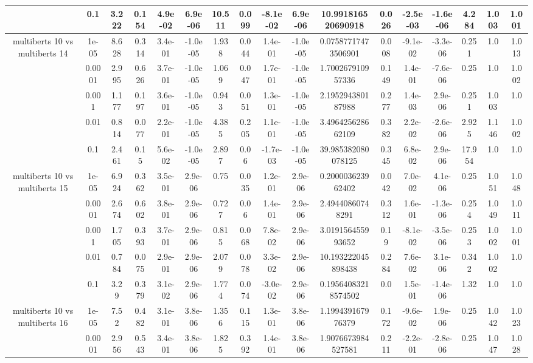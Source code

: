 \begin{tabular}{|c|c|c|c|c|c|c|c|c|c|c|c|c|c|c|c|c|}
 & 0.1 & 3.222 & 0.154 & 4.9e-02 & 6.9e-06 & 10.511 & 0.099 & -8.1e-02 & 6.9e-06 & 10.991816520690918 & 0.026 & -2.5e-03 & -1.6e-06 & 4.284 & 1.003 & 1.001 \\
\hline
\multirow{5}{*}{multiberts 10 vs multiberts 14} & 1e-05 & 8.628 & 0.314 & 3.4e-01 & -1.0e-05 & 1.938 & 0.044 & 1.4e-01 & -1.0e-05 & 0.07587717473506901 & 0.008 & -9.1e-02 & -3.3e-06 & 0.251 & 1.0 & 1.013 \\
 & 0.0001 & 2.995 & 0.626 & 3.7e-01 & -1.0e-05 & 1.069 & 0.047 & 1.7e-01 & -1.0e-05 & 1.700267910957336 & 0.149 & 1.4e-01 & -7.6e-06 & 0.25 & 1.0 & 1.002 \\
 & 0.001 & 1.177 & 0.197 & 3.6e-01 & -1.0e-05 & 0.943 & 0.051 & 1.3e-01 & -1.0e-05 & 2.195294380187988 & 0.277 & 1.4e-03 & 2.9e-06 & 0.251 & 1.003 & 1.0 \\
 & 0.01 & 0.814 & 0.077 & 2.2e-01 & -1.0e-05 & 4.385 & 0.205 & 1.1e-01 & -1.0e-05 & 3.496425628662109 & 0.382 & 2.2e-02 & -2.6e-06 & 2.925 & 1.146 & 1.002 \\
 & 0.1 & 2.461 & 0.15 & 5.6e-02 & -1.0e-05 & 2.897 & 0.06 & -1.7e-03 & -1.0e-05 & 39.985382080078125 & 0.345 & 6.8e-02 & 2.9e-06 & 17.954 & 1.0 & 1.0 \\
\hline
\multirow{5}{*}{multiberts 10 vs multiberts 15} & 1e-05 & 6.924 & 0.362 & 3.5e-01 & 2.9e-06 & 0.75 & 0.035 & 1.2e-01 & 2.9e-06 & 0.200003623962402 & 0.042 & 7.0e-02 & 4.1e-06 & 0.25 & 1.051 & 1.048 \\
 & 0.0001 & 2.674 & 0.602 & 3.8e-01 & 2.9e-06 & 0.727 & 0.06 & 1.4e-01 & 2.9e-06 & 2.49440860748291 & 0.312 & 1.6e-01 & -1.3e-06 & 0.254 & 1.049 & 1.011 \\
 & 0.001 & 1.705 & 0.393 & 3.7e-01 & 2.9e-06 & 0.815 & 0.068 & 7.8e-02 & 2.9e-06 & 3.019156455993652 & 0.19 & -8.1e-02 & -3.5e-06 & 0.253 & 1.002 & 1.001 \\
 & 0.01 & 0.784 & 0.075 & 2.9e-01 & 2.9e-06 & 2.079 & 0.078 & 3.3e-02 & 2.9e-06 & 10.193222045898438 & 0.284 & 7.6e-02 & 3.1e-06 & 0.342 & 1.002 & 1.0 \\
 & 0.1 & 3.29 & 0.379 & 3.1e-02 & 2.9e-06 & 1.774 & 0.074 & -3.0e-02 & 2.9e-06 & 0.19564083218574502 & 0.0 & 1.5e-01 & -1.4e-06 & 1.32 & 1.0 & 1.0 \\
\hline
\multirow{5}{*}{multiberts 10 vs multiberts 16} & 1e-05 & 7.52 & 0.482 & 3.1e-01 & 3.8e-06 & 1.356 & 0.115 & 1.3e-01 & 3.8e-06 & 1.199439167976379 & 0.172 & -9.6e-02 & 1.9e-06 & 0.25 & 1.042 & 1.023 \\
 & 0.0001 & 2.956 & 0.543 & 3.4e-01 & 3.8e-06 & 1.825 & 0.392 & 1.4e-01 & 3.8e-06 & 1.9076673984527581 & 0.211 & -2.2e-01 & -2.8e-06 & 0.25 & 1.047 & 1.028 \\

\end{tabular}
